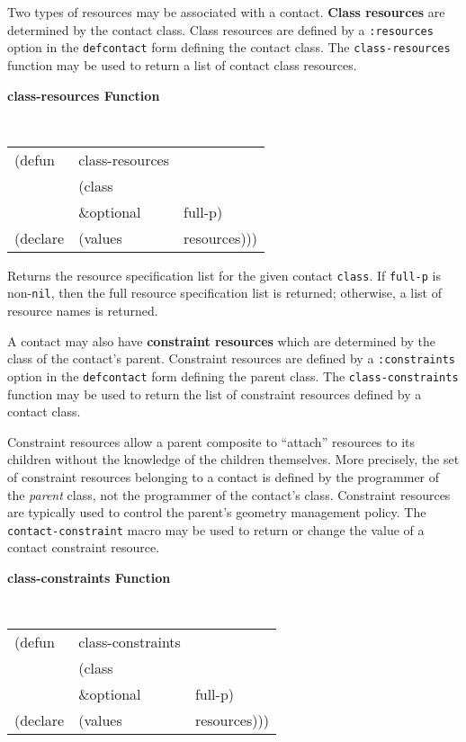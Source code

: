 Two types of resources may be associated with a contact. {\bf Class
resources} are determined by the contact class. Class resources are
defined by a {\tt :resources} option in the {\tt defcontact} form
defining the contact class.
The {\tt class-resources} function may be used to return a list of
contact class resources.

{\samepage
{\large {\bf class-resources \hfill Function}} 
\begin{flushright} \parbox[t]{6.125in}{
\tt
\begin{tabular}{lll}
\raggedright
(defun & class-resources & \\ 
& (class\\
& \&optional & full-p) \\
(declare &(values  & resources)))
\end{tabular}
\rm

}\end{flushright}}

\begin{flushright} \parbox[t]{6.125in}{
Returns the resource specification list for the given contact {\tt class}. If
{\tt full-p} is non-{\tt nil}, then the full resource specification list is
returned; otherwise, a list of resource names is returned.

}\end{flushright}

A contact may also have {\bf constraint
resources} which are determined by the class
of the contact's parent. Constraint resources are
defined by a {\tt :constraints} option in the {\tt defcontact} form
defining the parent class.
The {\tt class-constraints} function may be used to return the list of
constraint resources defined by a contact class.

Constraint resources allow a parent composite to ``attach'' resources to
its children without the knowledge of the children themselves.  More
precisely, the set of constraint resources belonging to a contact is
defined by the programmer of the {\em parent} class, not the programmer
of the contact's class.  Constraint resources are typically used to
control the parent's geometry management policy. The {\tt
contact-constraint} macro may be used to return or change the value of a
contact constraint resource. 

{\samepage
{\large {\bf class-constraints \hfill Function}} 
\begin{flushright} \parbox[t]{6.125in}{
\tt
\begin{tabular}{lll}
\raggedright
(defun & class-constraints & \\ 
& (class\\
& \&optional & full-p) \\
(declare &(values  & resources)))
\end{tabular}
\rm

}\end{flushright}}

